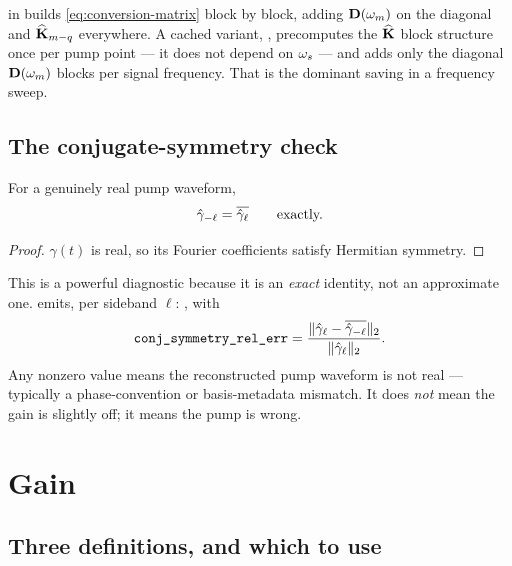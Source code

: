 \begin{implnote}[assembly]
 in  builds
\eqref{eq:conversion-matrix} block by block, adding $\mathbf{D}(\omega_m)$ on the
diagonal and $\widehat{\mathbf{K}}_{m-q}$ everywhere. A cached variant,
, precomputes the $\widehat{\mathbf{K}}$
block structure once per pump point --- it does not depend on $\omega_{s}$ --- and adds
only the diagonal $\mathbf{D}(\omega_m)$ blocks per signal frequency. That is the
dominant saving in a frequency sweep.
\end{implnote}

\subsection{The conjugate-symmetry check}

\begin{proposition}
For a genuinely real pump waveform,
\begin{equation}
  \hat{\gamma}_{-\ell} = \overline{\hat{\gamma}_{\ell}}
  \qquad\text{exactly.}
  \label{eq:conj-symmetry}
\end{equation}
\end{proposition}
\begin{proof}
$\gamma(t)$ is real, so its Fourier coefficients satisfy Hermitian symmetry.
\end{proof}

\begin{implnote}
This is a powerful diagnostic because it is an \emph{exact} identity, not an
approximate one.  emits, per sideband $\ell$:
, with
\begin{equation}
  \texttt{conj\_symmetry\_rel\_err}
  = \frac{\|\hat{\gamma}_\ell - \overline{\hat{\gamma}_{-\ell}}\|_2}{\|\hat{\gamma}_\ell\|_2}.
\end{equation}
Any nonzero value means the reconstructed pump waveform is not real ---
typically a phase-convention or basis-metadata mismatch. It does \emph{not} mean
the gain is slightly off; it means the pump is wrong.
\end{implnote}

\section{Gain}

\subsection{Three definitions, and which to use}


